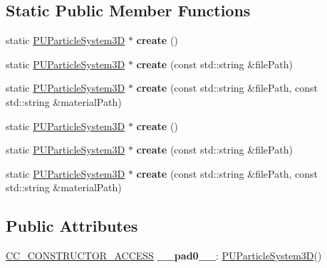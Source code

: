 \subsection*{Static Public Member Functions}
\begin{DoxyCompactItemize}
\item 
\mbox{\label{classPUParticleSystem3D_abb377b91f5723825f5c2bcc1122896aa}} 
static \hyperlink{classPUParticleSystem3D}{P\+U\+Particle\+System3D} $\ast$ {\bfseries create} ()
\item 
\mbox{\label{classPUParticleSystem3D_a485d3855a90f5b419d8e30e6e87a9948}} 
static \hyperlink{classPUParticleSystem3D}{P\+U\+Particle\+System3D} $\ast$ {\bfseries create} (const std\+::string \&file\+Path)
\item 
\mbox{\label{classPUParticleSystem3D_ade86f50c9bbf6df1a632f881a1f9634a}} 
static \hyperlink{classPUParticleSystem3D}{P\+U\+Particle\+System3D} $\ast$ {\bfseries create} (const std\+::string \&file\+Path, const std\+::string \&material\+Path)
\item 
\mbox{\label{classPUParticleSystem3D_a5dc599caa0ff3c98ea71f7e794fd94ac}} 
static \hyperlink{classPUParticleSystem3D}{P\+U\+Particle\+System3D} $\ast$ {\bfseries create} ()
\item 
\mbox{\label{classPUParticleSystem3D_a53b4942fad02019d72933d1670c636ea}} 
static \hyperlink{classPUParticleSystem3D}{P\+U\+Particle\+System3D} $\ast$ {\bfseries create} (const std\+::string \&file\+Path)
\item 
\mbox{\label{classPUParticleSystem3D_a7a0d3e78604acea3d055d6c7fc30e997}} 
static \hyperlink{classPUParticleSystem3D}{P\+U\+Particle\+System3D} $\ast$ {\bfseries create} (const std\+::string \&file\+Path, const std\+::string \&material\+Path)
\end{DoxyCompactItemize}
\subsection*{Public Attributes}
\begin{DoxyCompactItemize}
\item 
\mbox{\label{classPUParticleSystem3D_ad4f70a4aaa8f409d4439e96de410554b}} 
\hyperlink{_2cocos2d_2cocos_2base_2ccConfig_8h_a25ef1314f97c35a2ed3d029b0ead6da0}{C\+C\+\_\+\+C\+O\+N\+S\+T\+R\+U\+C\+T\+O\+R\+\_\+\+A\+C\+C\+E\+SS} {\bfseries \+\_\+\+\_\+pad0\+\_\+\+\_\+}\+: \hyperlink{classPUParticleSystem3D}{P\+U\+Particle\+System3D}()
\end{DoxyCompactItemize}
